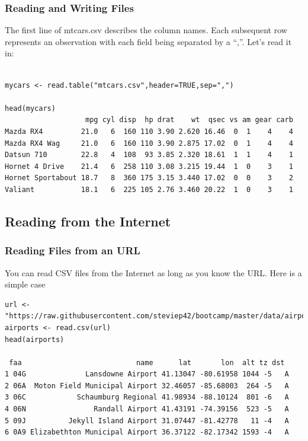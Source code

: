 \documentclass{beamer}
\begin{document}
\begin{frame}[fragile]
\frametitle{Reading and Writing Files }
The first line of mtcars.csv describes the column names. Each subsequent row represents an observation with each field being separated by a ``,''. Let's read it in:
\footnotesize
\begin{verbatim}

mycars <- read.table("mtcars.csv",header=TRUE,sep=",")

head(mycars)
                   mpg cyl disp  hp drat    wt  qsec vs am gear carb
Mazda RX4         21.0   6  160 110 3.90 2.620 16.46  0  1    4    4
Mazda RX4 Wag     21.0   6  160 110 3.90 2.875 17.02  0  1    4    4
Datsun 710        22.8   4  108  93 3.85 2.320 18.61  1  1    4    1
Hornet 4 Drive    21.4   6  258 110 3.08 3.215 19.44  1  0    3    1
Hornet Sportabout 18.7   8  360 175 3.15 3.440 17.02  0  0    3    2
Valiant           18.1   6  225 105 2.76 3.460 20.22  1  0    3    1 
\end{verbatim}
\footnotesize
\end{frame}

\subsection{Reading from the Internet}
%
\begin{frame}[fragile]
\frametitle{Reading Files from an URL}
You can read CSV files from the Internet as long as you know the URL. Here is a simple case
\tiny
\begin{verbatim}
url <- "https://raw.githubusercontent.com/steviep42/bootcamp/master/data/airports.csv"
airports <- read.csv(url)
head(airports)

 faa                           name      lat       lon  alt tz dst
1 04G              Lansdowne Airport 41.13047 -80.61958 1044 -5   A
2 06A  Moton Field Municipal Airport 32.46057 -85.68003  264 -5   A
3 06C            Schaumburg Regional 41.98934 -88.10124  801 -6   A
4 06N                Randall Airport 41.43191 -74.39156  523 -5   A
5 09J          Jekyll Island Airport 31.07447 -81.42778   11 -4   A
6 0A9 Elizabethton Municipal Airport 36.37122 -82.17342 1593 -4   A

\end{verbatim}
\footnotesize
\end{frame}


%
\end{document}
